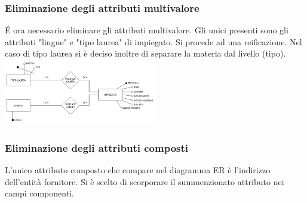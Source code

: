 \documentclass{article}
\begin{document}
\subsubsection{Eliminazione degli attributi multivalore}
É ora necessario eliminare gli attributi multivalore.
\newline
Gli unici presenti sono gli attributi "lingue" e "tipo laurea" di impiegato.
\newline
Si procede ad una reificazione.
\newline
\newline
Nel caso di tipo laurea si è deciso inoltre di separare la materia dal livello (tipo).
\newline
\newline
\includegraphics[width=0.5\textwidth]{er_R3.png}

\subsubsection{Eliminazione degli attributi composti}
L'unico attributo composto che compare nel diagramma ER è l'indirizzo dell'entità fornitore.
\newline
Si è scelto di scorporare il summenzionato attributo nei campi componenti.

\newpage
\end{document}
